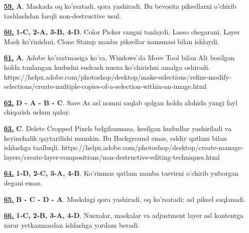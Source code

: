 \documentclass[10pt,a4paper,oneside]{article}
\begin{document}
\par\vspace{3mm}
\noindent\hyperlink{q59}{\textbf{59.}} \textbf{A}.  Maskada oq ko'rsatadi, qora yashiradi. Bu bevosita piksellarni o'chirib tashlashdan farqli non-destructive usul.
\par\vspace{3mm}
\noindent\hyperlink{q60}{\textbf{60.}} \textbf{1-C, 2-A, 3-B, 4-D}.  Color Picker rangni tanlaydi, Lasso chegarani, Layer Mask ko'rinishni, Clone Stamp manba piksellar namunasi bilan ishlaydi.
\par\vspace{3mm}
\noindent\hyperlink{q61}{\textbf{61.}} \textbf{A}.  Adobe ko'rsatmasiga ko'ra, Windows'da Move Tool bilan Alt bosilgan holda tanlangan hududni sudrash nusxa ko'chirishni amalga oshiradi. https://helpx.adobe.com/photoshop/desktop/make-selections/refine-modify-selections/create-multiple-copies-of-a-selection-within-an-image.html
\par\vspace{3mm}
\noindent\hyperlink{q62}{\textbf{62.}} \textbf{D - A - B - C}.  Save As asl nomni saqlab qolgan holda alohida yangi fayl chiqarish uchun qulay.
\par\vspace{3mm}
\noindent\hyperlink{q63}{\textbf{63.}} \textbf{C}.  Delete Cropped Pixels belgilanmasa, kesilgan hududlar yashiriladi va keyinchalik qaytarilishi mumkin. Bu Background emas, oddiy qatlam bilan ishlashga taalluqli. https://helpx.adobe.com/photoshop/desktop/create-manage-layers/create-layer-compositions/non-destructive-editing-techniques.html
\par\vspace{3mm}
\noindent\hyperlink{q64}{\textbf{64.}} \textbf{1-D, 2-C, 3-A, 4-B}.  Ko'rinmas qatlam manba tasvirni o'chirib yuborgan degani emas.
\par\vspace{3mm}
\noindent\hyperlink{q65}{\textbf{65.}} \textbf{B - C - D - A}.  Maskdagi qora yashiradi, oq ko'rsatadi; asl piksel saqlanadi.
\par\vspace{3mm}
\noindent\hyperlink{q66}{\textbf{66.}} \textbf{1-C, 2-B, 3-A, 4-D}.  Nusxalar, maskalar va adjustment layer asl kontentga zarar yetkazmasdan ishlashga yordam beradi.
\par\vspace{3mm}
\end{document}

